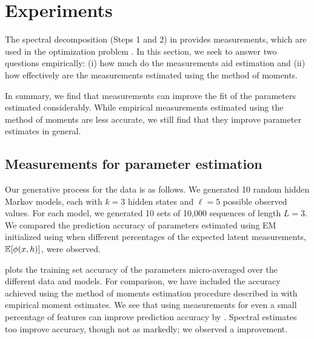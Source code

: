\section{Experiments} \label{sec:experiments}

The spectral decomposition (Steps 1 and 2) in 
provides measurements,
which are used in the optimization problem .
In this section, we
seek to answer two questions empirically:
(i) how much do the measurements aid estimation and 
(ii) how effectively are the measurements estimated using the
method of moments.

In summary, we find that measurements can improve the fit of the
parameters estimated considerably.
While empirical measurements estimated using the
method of moments are less accurate, we still find that they improve
parameter estimates in general.

\subsection{Measurements for parameter estimation}

Our generative process for the data is as follows.
We generated 10 random hidden Markov models,
each with $k=3$ hidden states and $\ell=5$ possible observed values. 
For each model, we generated 10 sets of 10,000 sequences of length $L=3$.
We compared the prediction accuracy of parameters estimated using EM
initialized using  when different percentages of the expected
latent measurements, $\mathbb{E}[\phi(x,h)]$, were observed.



 plots the training set accuracy of the parameters
micro-averaged over the different data and models.  For comparison, we have
included the accuracy achieved using the method of moments estimation procedure
described in  with empirical moment estimates.  We see
that using measurements for even a small percentage of features can improve
prediction accuracy by . Spectral estimates too improve accuracy,
though not as markedly; we observed a  improvement.


